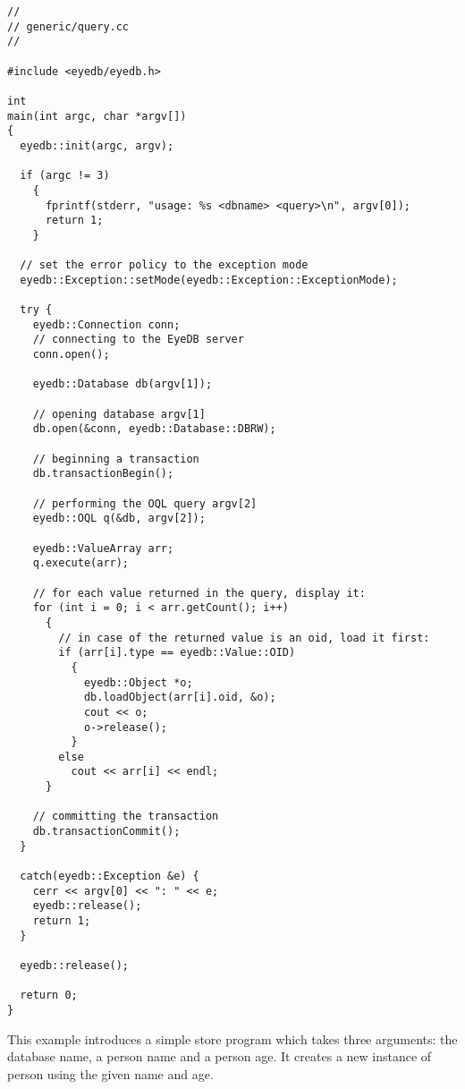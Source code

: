 \begin{verbatim}
//
// generic/query.cc
//

#include <eyedb/eyedb.h>

int
main(int argc, char *argv[])
{
  eyedb::init(argc, argv);

  if (argc != 3)
    {
      fprintf(stderr, "usage: %s <dbname> <query>\n", argv[0]);
      return 1;
    }

  // set the error policy to the exception mode
  eyedb::Exception::setMode(eyedb::Exception::ExceptionMode);

  try {
    eyedb::Connection conn;
    // connecting to the EyeDB server
    conn.open();

    eyedb::Database db(argv[1]);

    // opening database argv[1]
    db.open(&conn, eyedb::Database::DBRW);

    // beginning a transaction
    db.transactionBegin();

    // performing the OQL query argv[2]
    eyedb::OQL q(&db, argv[2]);

    eyedb::ValueArray arr;
    q.execute(arr);

    // for each value returned in the query, display it:
    for (int i = 0; i < arr.getCount(); i++)
      {
        // in case of the returned value is an oid, load it first:
        if (arr[i].type == eyedb::Value::OID)
          {
            eyedb::Object *o;
            db.loadObject(arr[i].oid, &o);
            cout << o;
            o->release();
          }
        else
          cout << arr[i] << endl;
      }

    // committing the transaction
    db.transactionCommit();
  }

  catch(eyedb::Exception &e) {
    cerr << argv[0] << ": " << e;
    eyedb::release();
    return 1;
  }

  eyedb::release();

  return 0;
}
\end{verbatim}
\normalsize
{}
This example introduces a simple store program which takes
three arguments: the database name, a person name and a person age. It
creates a new instance of person using the given name and age.
\verbsize
